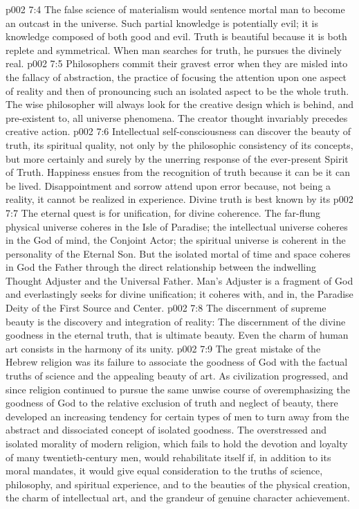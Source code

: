\pc \vs p002 7:4 The false science of materialism would sentence mortal man to become an outcast in the universe. Such partial knowledge is potentially evil; it is knowledge composed of both good and evil. Truth is beautiful because it is both replete and symmetrical. When man searches for truth, he pursues the divinely real.
\vs p002 7:5 Philosophers commit their gravest error when they are misled into the fallacy of abstraction, the practice of focusing the attention upon one aspect of reality and then of pronouncing such an isolated aspect to be the whole truth. The wise philosopher will always look for the creative design which is behind, and pre\hyp{}existent to, all universe phenomena. The creator thought invariably precedes creative action.
\vs p002 7:6 Intellectual self\hyp{}consciousness can discover the beauty of truth, its spiritual quality, not only by the philosophic consistency of its concepts, but more certainly and surely by the unerring response of the ever\hyp{}present Spirit of Truth. Happiness ensues from the recognition of truth because it can be  it can be lived. Disappointment and sorrow attend upon error because, not being a reality, it cannot be realized in experience. Divine truth is best known by its 
\pc \vs p002 7:7 The eternal quest is for unification, for divine coherence. The far\hyp{}flung physical universe coheres in the Isle of Paradise; the intellectual universe coheres in the God of mind, the Conjoint Actor; the spiritual universe is coherent in the personality of the Eternal Son. But the isolated mortal of time and space coheres in God the Father through the direct relationship between the indwelling Thought Adjuster and the Universal Father. Man’s Adjuster is a fragment of God and everlastingly seeks for divine unification; it coheres with, and in, the Paradise Deity of the First Source and Center.
\pc \vs p002 7:8 The discernment of supreme beauty is the discovery and integration of reality: The discernment of the divine goodness in the eternal truth, that is ultimate beauty. Even the charm of human art consists in the harmony of its unity.
\vs p002 7:9 The great mistake of the Hebrew religion was its failure to associate the goodness of God with the factual truths of science and the appealing beauty of art. As civilization progressed, and since religion continued to pursue the same unwise course of overemphasizing the goodness of God to the relative exclusion of truth and neglect of beauty, there developed an increasing tendency for certain types of men to turn away from the abstract and dissociated concept of isolated goodness. The overstressed and isolated morality of modern religion, which fails to hold the devotion and loyalty of many twentieth\hyp{}century men, would rehabilitate itself if, in addition to its moral mandates, it would give equal consideration to the truths of science, philosophy, and spiritual experience, and to the beauties of the physical creation, the charm of intellectual art, and the grandeur of genuine character achievement.
